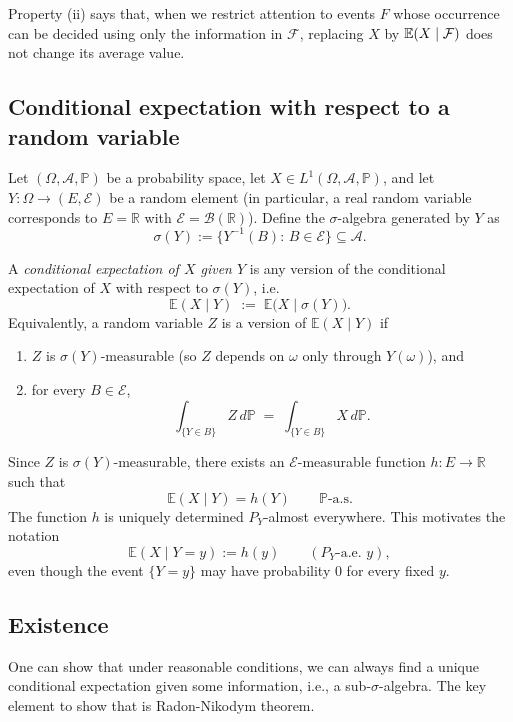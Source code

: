 \begin{remark}
Property (ii) says that, when we restrict attention to events $F$ whose occurrence can be decided using only the
information in $\mathcal F$, replacing $X$ by $\mathbb{E}(X\mid\mathcal F)$ does not change its average value.
\end{remark}


\subsection*{Conditional expectation with respect to a random variable}

Let $(\Omega,\mathcal A,\mathbb P)$ be a probability space, let $X\in L^1(\Omega,\mathcal A,\mathbb P)$, and let
$Y:\Omega\to(E,\mathcal E)$ be a random element (in particular, a real random variable corresponds to $E=\mathbb R$
with $\mathcal E=\mathcal B(\mathbb R)$). Define the $\sigma$-algebra generated by $Y$ as
\[
\sigma(Y):=\{Y^{-1}(B):\, B\in\mathcal E\}\subseteq \mathcal A.
\]
\begin{definition}
A \emph{conditional expectation of $X$ given $Y$} is any version of the conditional expectation of $X$ with respect
to $\sigma(Y)$, i.e.
\[
\mathbb E(X\mid Y)\;:=\;\mathbb E\bigl(X\mid\sigma(Y)\bigr).
\]
Equivalently, a random variable $Z$ is a version of $\mathbb E(X\mid Y)$ if
\begin{enumerate}
\item[(i)] $Z$ is $\sigma(Y)$-measurable (so $Z$ depends on $\omega$ only through $Y(\omega)$), and
\item[(ii)] for every $B\in\mathcal E$,
\[
\int_{\{Y\in B\}} Z\,d\mathbb P \;=\; \int_{\{Y\in B\}} X\,d\mathbb P.
\]
\end{enumerate}
\end{definition}

\begin{remark}
Since $Z$ is $\sigma(Y)$-measurable, there exists an $\mathcal E$-measurable function $h:E\to\mathbb R$ such that
\[
\mathbb E(X\mid Y)=h(Y)\qquad \text{$\mathbb P$-a.s.}
\]
The function $h$ is uniquely determined $P_Y$-almost everywhere. This motivates the notation
\[
\mathbb E(X\mid Y=y):=h(y)\qquad (P_Y\text{-a.e. }y),
\]
even though the event $\{Y=y\}$ may have probability $0$ for every fixed $y$.
\end{remark}

\subsection*{Existence}
One can show that under reasonable conditions, we can always find a unique conditional expectation given some information, i.e., a sub-$\sigma$-algebra. The key element to show that is Radon-Nikodym theorem.


